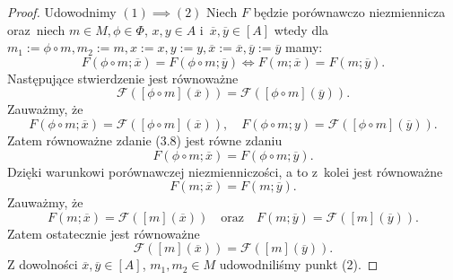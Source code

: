 \documentclass[12pt,a4paper]{report}
\newcommand{\domkniecie}[1]{\left[ {#1} \right] }
\begin{document}
\begin{proof}
Udowodnimy $(1) \implies (2)$
Niech $F$ będzie porównawczo niezmiennicza oraz~niech $m\in M, \phi \in \Phi$, $x, y \in A$ i~$\overline{x}, \overline{y} \in \domkniecie{A}$ wtedy dla $m_1:=\phi\circ m, m_2:=m, x:=x, y:=y, \overline{x}:=\overline{x}, \overline{y}:=\overline{y}$ mamy:
$$
F(\phi\circ m;\overline{x})=F(\phi\circ m;\overline{y}) \iff F(m;\overline{x})=F(m;\overline{y}).
$$
Następujące stwierdzenie jest równoważne
\begin{equation}
\mathcal{F}(\domkniecie{\phi \circ m}(\overline{x}))=\mathcal{F}(\domkniecie{\phi \circ m}(\overline{y})).
\end{equation}
Zauważmy, że
$$
F(\phi \circ m;\overline{x})=\mathcal{F}( \domkniecie{\phi \circ m}(\overline{x})), \quad F(\phi \circ m;y)=\mathcal{F}(\domkniecie{\phi\circ m}(\overline{y})).
$$
Zatem równoważne zdanie (3.8) jest równe zdaniu
$$
F(\phi\circ m;\overline{x})=F(\phi \circ m;\overline{y}).
$$
Dzięki warunkowi porównawczej niezmienniczości, a to z~kolei jest równoważne
$$
F(m;\overline{x})=F(m;\overline{y}).
$$
Zauważmy, że 
$$
F(m;\overline{x})=\mathcal{F}(\domkniecie{m}(\overline{x})) \quad \textrm{oraz} \quad F(m;\overline{y})=\mathcal{F}(\domkniecie{m}(\overline{y})).
$$
Zatem ostatecznie jest równoważne 
$$
\mathcal{F}(\domkniecie{m}(\overline{x}))=\mathcal{F}(\domkniecie{m}(\overline{y})).
$$
Z dowolności $\overline{x}, \overline{y} \in \domkniecie{A}$, $m_1, m_2 \in M$ udowodniliśmy punkt (2).


\end{proof}
\end{document}
